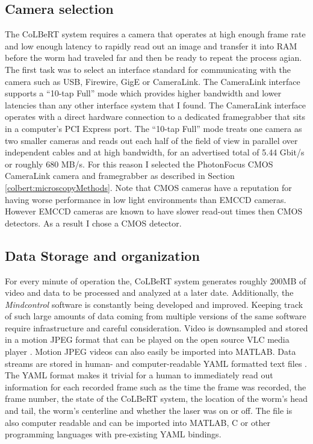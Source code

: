\subsection{Camera selection}
The CoLBeRT system requires a camera that operates at high enough frame rate and low enough latency to rapidly read out an image and transfer it into RAM before the worm had traveled far and then be ready to repeat the process agian. The first task was to select an interface standard for communicating with the camera such as USB, Firewire, GigE or CameraLink.  The CameraLink interface supports a ``10-tap Full'' mode which provides higher bandwidth and lower latencies than any other interface system that I found. The CameraLink interface operates with a direct hardware connection to a dedicated framegrabber that sits in a computer's PCI Express port. The ``10-tap Full'' mode treats one camera as two smaller cameras and reads out each half of the field of view in parallel over  independent cables and at high bandwidth, for an advertised total of 5.44 Gbit/s  or roughly 680 MB/s. For this reason I selected the PhotonFocus CMOS CameraLink camera and framegrabber as described in  Section \ref{colbert:microscopyMethods}. Note that CMOS cameras have a reputation for having  worse performance in low light environments than EMCCD cameras. However EMCCD cameras are known to have slower read-out times then CMOS detectors. As a result I chose a CMOS detector.

\subsection{Data Storage and organization}
For every minute of operation the, CoLBeRT system generates roughly 200MB of  video and data to be processed and analyzed at a later date. Additionally, the \emph{Mindcontrol} software is constantly being developed and improved. Keeping track of such large amounts of data coming from multiple versions of the same software require infrastructure and careful consideration. Video is downsampled and stored in a motion JPEG format that can be played on the open source VLC media player \citep{the_video_lan_organization_videolan_2012}. Motion JPEG videos can also easily be imported into MATLAB. Data streams are stored in human- and computer-readable YAML formatted text files \citep{evans_official_2011}. The YAML format makes it trivial for a human to immediately read out information for each recorded frame such as the time the frame was recorded, the frame number, the state of the CoLBeRT system, the location of the worm's head and tail, the worm's centerline and whether the laser was on or off. The file is also computer readable and can be imported into MATLAB, C or other programming languages with pre-existing YAML bindings. 

